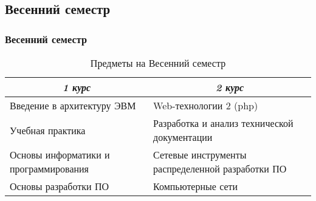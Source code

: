 \subsection{Весенний семестр}
\begin{frame}
\frametitle{Весенний семестр}

\begin{table}[htbp]
\centering
\begin{tabularx}{\linewidth}{|l|X|}
\multicolumn{1}{c}{\textit{\textbf{1 курс}}} & \multicolumn{1}{c}{\textit{\textbf{2 курс}}}                                 \tabularnewline \midrule
Введение в архитектуру ЭВМ      & Web-технологии 2 (php)      
\tabularnewline \midrule
Учебная практика                & Разработка и анализ технической документации 
\tabularnewline \midrule
Основы информатики и программирования & Сетевые инструменты распределенной разработки ПО
\tabularnewline \midrule
Основы разработки ПО & Компьютерные сети
\tabularnewline \bottomrule
\end{tabularx}
\caption{Предметы на Весенний семестр}

\end{table}

\end{frame}

